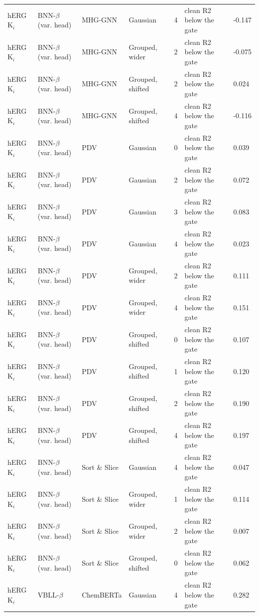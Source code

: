 {\begin{longtable}{llllcll}
hERG K$_i$ & BNN-$\beta$ (var. head) & MHG-GNN & Gaussian & 4 & clean R2 below the gate & -0.147 \\
hERG K$_i$ & BNN-$\beta$ (var. head) & MHG-GNN & Grouped, wider & 2 & clean R2 below the gate & -0.075 \\
hERG K$_i$ & BNN-$\beta$ (var. head) & MHG-GNN & Grouped, shifted & 2 & clean R2 below the gate & 0.024 \\
hERG K$_i$ & BNN-$\beta$ (var. head) & MHG-GNN & Grouped, shifted & 4 & clean R2 below the gate & -0.116 \\
hERG K$_i$ & BNN-$\beta$ (var. head) & PDV & Gaussian & 0 & clean R2 below the gate & 0.039 \\
hERG K$_i$ & BNN-$\beta$ (var. head) & PDV & Gaussian & 2 & clean R2 below the gate & 0.072 \\
hERG K$_i$ & BNN-$\beta$ (var. head) & PDV & Gaussian & 3 & clean R2 below the gate & 0.083 \\
hERG K$_i$ & BNN-$\beta$ (var. head) & PDV & Gaussian & 4 & clean R2 below the gate & 0.023 \\
hERG K$_i$ & BNN-$\beta$ (var. head) & PDV & Grouped, wider & 2 & clean R2 below the gate & 0.111 \\
hERG K$_i$ & BNN-$\beta$ (var. head) & PDV & Grouped, wider & 4 & clean R2 below the gate & 0.151 \\
hERG K$_i$ & BNN-$\beta$ (var. head) & PDV & Grouped, shifted & 0 & clean R2 below the gate & 0.107 \\
hERG K$_i$ & BNN-$\beta$ (var. head) & PDV & Grouped, shifted & 1 & clean R2 below the gate & 0.120 \\
hERG K$_i$ & BNN-$\beta$ (var. head) & PDV & Grouped, shifted & 2 & clean R2 below the gate & 0.190 \\
hERG K$_i$ & BNN-$\beta$ (var. head) & PDV & Grouped, shifted & 4 & clean R2 below the gate & 0.197 \\
hERG K$_i$ & BNN-$\beta$ (var. head) & Sort \& Slice & Gaussian & 4 & clean R2 below the gate & 0.047 \\
hERG K$_i$ & BNN-$\beta$ (var. head) & Sort \& Slice & Grouped, wider & 1 & clean R2 below the gate & 0.114 \\
hERG K$_i$ & BNN-$\beta$ (var. head) & Sort \& Slice & Grouped, wider & 2 & clean R2 below the gate & 0.007 \\
hERG K$_i$ & BNN-$\beta$ (var. head) & Sort \& Slice & Grouped, shifted & 0 & clean R2 below the gate & 0.062 \\
hERG K$_i$ & VBLL-$\beta$ & ChemBERTa & Gaussian & 4 & clean R2 below the gate & 0.282 \\

\end{longtable}}

